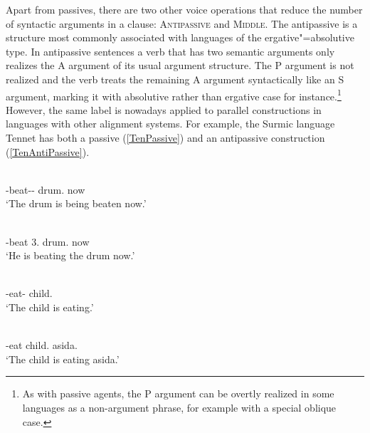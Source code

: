 Apart from passives, there are two other voice operations that reduce the number of syntactic arguments in a clause: \textsc{Antipassive} and \textsc{Middle}.
The antipassive is a structure most commonly associated with languages of the ergative"=absolutive type.
In antipassive sentences a verb that has two semantic arguments only realizes the A argument of its usual argument structure. 
The P argument is not realized and the verb treats the remaining A argument syntactically like an S argument, marking it with absolutive rather than ergative case for instance.\footnote{As with passive agents, the P argument can be overtly realized in some languages as a non-argument phrase, for example with a special oblique case.} 
However, the same label is nowadays applied to parallel constructions in languages with other alignment systems. 
For example, the Surmic language Tennet has both a passive (\ref{TenPassive}) and an antipassive construction (\ref{TenAntiPassive}).

\begin{exe}\ex\label{TenPassive} 
\begin{xlist}
\ex\gll{}  \\
\ipfv{}-beat-\epen{}-\pass{} drum.\nom{} now\\
\glt `The drum is being beaten now.' 

\ex\gll{}   \\
\ipfv{}-beat 3\sg{}.\nom{} drum.\acc{} now\\
\glt `He is beating the drum now.' 
\end{xlist}
\end{exe}

\begin{exe}\ex\label{TenAntiPassive}
\begin{xlist}
\ex\gll{} \\
\ipfv{}-eat-\antip{} child.\nom{}\\
\glt `The child is eating.' 

\ex\gll{}  \\
\ipfv{}-eat child.\nom{} asida.\acc{}\\
\glt `The child is eating asida.' 
\end{xlist}
\end{exe}

